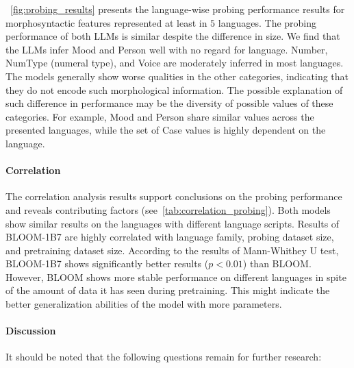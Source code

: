 ~\autoref{fig:probing_results} presents the language-wise probing performance results for morphosyntactic features represented at least in $5$ languages. The probing performance of both LLMs is similar despite the difference in size. We find that the LLMs infer Mood and Person well with no regard for language. Number, NumType (numeral type), and Voice are moderately inferred in most languages. The models generally show worse qualities in the other categories, indicating that they do not encode such morphological information. The possible explanation of such difference in performance may be the diversity of possible values of these categories. For example, Mood and Person share similar values across the presented languages, while the set of Case values is highly dependent on the language.

\paragraph{Correlation}

The correlation analysis results support conclusions on the probing performance and reveals contributing factors (see~\autoref{tab:correlation_probing}). Both models show similar results on the languages with different language scripts. Results of BLOOM-1B7 are highly correlated with language family, probing dataset size, and pretraining dataset size. According to the results of Mann-Whithey U test, BLOOM-1B7 shows significantly better results ($p < 0.01$) than BLOOM. However, BLOOM shows more stable performance on different languages in spite of the amount of data it has seen during pretraining. This might indicate the better generalization abilities of the model with more parameters. 

\paragraph{Discussion}

It should be noted that the following questions remain for further research:


